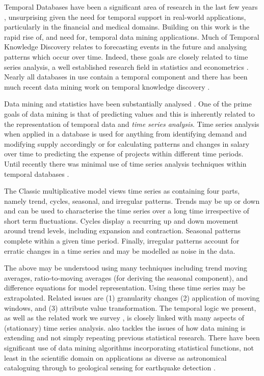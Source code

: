 \medskip

Temporal
Databases have been a significant area of research in the last few
years \cite{tcg93,ct95}, unsurprising given the need for temporal
support in real-world applications, particularly in the financial and
medical domains. Building on this work is the rapid rise of, and need
for, temporal data mining applications.  
Much of Temporal Knowledge Discovery relates to forecasting events in the
future and analysing 
patterns which occur over time. Indeed, these goals are closely
related to time series analysis, a well established research field in
statistics and econometrics \cite{end95,naze88}. Nearly all databases
in use contain a 
temporal component and there has been much recent data  mining work on
temporal knowledge discovery \cite{alss95,pt96,bc96,bt98}. 

\medskip

Data mining and statistics have been substantially analysed
\cite{fhs96,gmp97}. One of the prime goals of data mining
is that of predicting values and this is inherently related to the
representation of temporal data and {\em time series analysis}. Time
series analysis when applied in a 
 database is used for anything from identifying demand and modifying
supply accordingly or for calculating patterns and changes in salary over time
to predicting the expense of projects within different time
periods. Until recently there was minimal use of time series analysis
techniques within temporal databases \cite{smd95}.

The Classic multiplicative model views time series as containing four
parts, namely trend, cycles, seasonal, and irregular patterns.
Trends may be up or down and can be used to characterise the time
series over a long time irrespective of short term fluctuations.
Cycles display a recurring up and down movement around trend levels,
including expansion and contraction. Seasonal patterns complete within
a given time period. Finally, irregular patterns account for erratic
changes in a time series and may be modelled as noise in the data.
\smallskip

The above may be understood using many techniques including trend
moving averages, ratio-to-moving averages (for deriving 
the seasonal component), and difference equations for model
representation. Using these time series may be extrapolated.
Related issues are (1) granularity changes (2) application of moving
windows, and (3) attribute value transformation. The temporal logic we
present, as well as the related work we survey
\cite{frm94,lai93,alss95,dgm97,dlm98}, is closely linked with many
aspects of (stationary) time series analysis. \cite{gmp97} also
tackles the issues of how data mining is extending and not simply
repeating previous statistical research. There have been significant
use of data mining algorithms incorporating statistical
functions, not least in the scientific domain on applications as
diverse as astronomical cataloguing through to geological sensing for
earthquake detection \cite{fhs96}.

